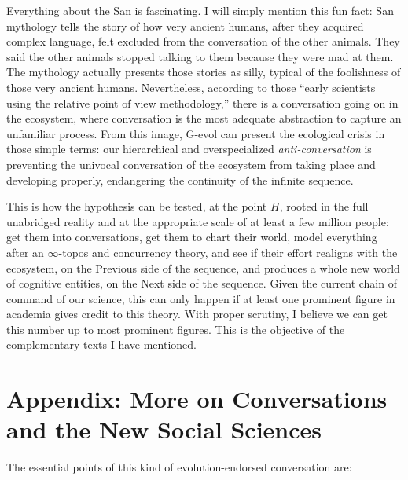 \documentclass[11pt]{article}
\begin{document}
Everything about the San is fascinating. I will simply mention this fun fact:
San mythology tells the story of how very ancient humans, after they acquired
complex language, felt excluded from the conversation of the other animals.
They said the other animals stopped talking to them because they were mad at
them. The mythology actually presents those stories as silly, typical of the
foolishness of those very ancient humans. Nevertheless, according to those
``early scientists using the relative point of view methodology,'' there is a
conversation going on in the ecosystem, where conversation is the most adequate
abstraction to capture an unfamiliar process. From this image, G-evol can
present the ecological crisis in those simple terms: our hierarchical and
overspecialized \emph{anti-conversation} is preventing the univocal
conversation of the ecosystem from taking place and developing properly,
endangering the continuity of the infinite sequence.

This is how the hypothesis can be tested, at the point \(H\), rooted in the
full unabridged reality and at the appropriate scale of at least a few million
people: get them into conversations, get them to chart their world, model
everything after an \(\infty\)-topos and concurrency theory, and see if their
effort realigns with the ecosystem, on the Previous side of the sequence, and
produces a whole new world of cognitive entities, on the Next side of the
sequence. Given the current chain of command of our science, this can only
happen if at least one prominent figure in academia gives credit to this
theory. With proper scrutiny, I believe we can get this number up to most
prominent figures. This is the objective of the complementary texts I have mentioned.

\section*{Appendix: More on Conversations and the New Social Sciences}

The essential points of this kind of evolution-endorsed conversation are:
\end{document}
